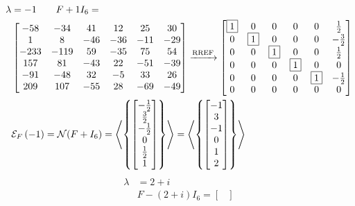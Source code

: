 \documentclass{ximera}
\begin{document}
\begin{example}
\begin{align*}
    \lambda&=-1\quad\quad F+1I_6=\\
           &
             \begin{bmatrix}
               -58 & -34 & 41 & 12 & 25 & 30\\
               1 & 8 & -46 & -36 & -11 & -29\\
               -233 & -119 & 59 & -35 & 75 & 54\\
               157 & 81 & -43 & 22 & -51 & -39\\
               -91 & -48 & 32 & -5 & 33 & 26\\
               209 & 107 & -55 & 28 & -69 & -49
             \end{bmatrix}
                                            \xrightarrow{\text{RREF}}
                                            \begin{bmatrix}
                                              \fbox{1} & 0 & 0 & 0 & 0 & \frac{1}{2}\\
                                              0 & \fbox{1} & 0 & 0 & 0 & -\frac{3}{2}\\
                                              0 & 0 & \fbox{1} & 0 & 0 & \frac{1}{2}\\
                                              0 & 0 & 0 & \fbox{1} & 0 & 0\\
                                              0 & 0 & 0 & 0 & \fbox{1} & -\frac{1}{2}\\
                                              0 & 0 & 0 & 0 & 0 & 0
                                            \end{bmatrix}\\
           &\mathcal{E}_{F}\left(-1\right)=\mathcal{N}\!\left(F+I_6\right)
             =\left\langle\left\{\begin{bmatrix}-\frac{1}{2}\\\frac{3}{2}\\-\frac{1}{2}\\0\\\frac{1}{2}\\1\end{bmatrix}\right\}\right\rangle
    =\left\langle\left\{\begin{bmatrix}-1\\3\\-1\\0\\1\\2\end{bmatrix}\right\}\right\rangle\\
  \end{align*}
  \begin{align*}
    \lambda&=2+i\\
           &F-(2+i)I_6=
             \begin{bmatrix}

\end{bmatrix}
\end{align*}
\end{example}
\end{document}
